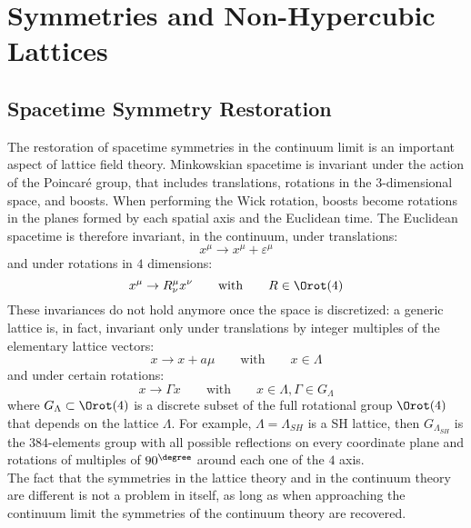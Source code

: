 \pagestyle{myFancy}
\chapter{Symmetries and Non-Hypercubic Lattices}

\section{Spacetime Symmetry Restoration}
The restoration of spacetime symmetries in the continuum limit is an important aspect of lattice field theory.
Minkowskian spacetime is invariant under the action of the Poincaré group, that includes translations, rotations in the $3$-dimensional space, and boosts.
When performing the Wick rotation, boosts become rotations in the planes formed by each spatial axis and the Euclidean time.
The Euclidean spacetime is therefore invariant, in the continuum, under translations:
\begin{equation}
    x^\mu \to x^\mu + \varepsilon^\mu \label{3:TranslCont}
\end{equation}
and under rotations in $4$ dimensions:
\begin{equation}
    x^\mu \to R^\mu_\nu x^\nu \qquad\text{with}\qquad R\in\Orot(4) \label{3:RotCont}
\end{equation}
These invariances do not hold anymore once the space is discretized: a generic lattice is, in fact, invariant only under translations by integer multiples of the elementary lattice vectors:
\begin{equation}
    x \to x + a\mu \qquad\text{with}\qquad x\in\Lambda \label{3:TraslDiscr}
\end{equation}
and under certain rotations:
\begin{equation}
    x \to \Gamma x \qquad\text{with}\qquad x\in\Lambda, \Gamma\in G_\Lambda \label{3:RotDiscr}
\end{equation}
where $G_\Lambda\subset\Orot(4)$ is a discrete subset of the full rotational group $\Orot(4)$ that depends on the lattice $\Lambda$.
For example, $\Lambda=\Lambda_{SH}$ is a SH lattice, then $G_{\Lambda_{SH}}$ is the $384$-elements group with all possible reflections on every coordinate plane and rotations of multiples of $90^\degree$ around each one of the $4$ axis.\\
The fact that the symmetries in the lattice theory and in the continuum theory are different is not a problem in itself, as long as when approaching the continuum limit the symmetries of the continuum theory are recovered.
